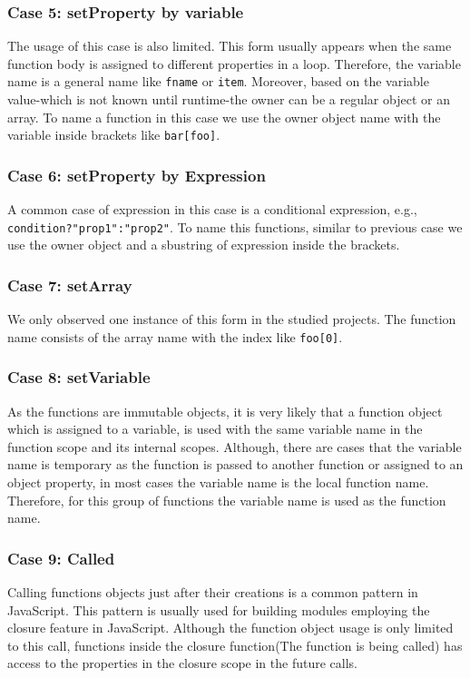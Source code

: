 \documentclass[10pt, preprint]{sigplanconf}
\begin{document}
{\subsubsection{Case 5: setProperty by variable}
The usage of this case is also limited. This form usually appears when the same function body is assigned to different properties in a loop. Therefore, the variable
 name is a general name like {\small\texttt{fname}} or {\small\texttt{item}}. Moreover, based on the variable value-which is not known until runtime-the owner can be a    regular object or an array. To name a function in this case we use the owner object name with the variable inside brackets like {\small\texttt{bar[foo]}}.

\subsubsection{Case 6: setProperty by Expression}
 A common case of expression in this case is a conditional expression, e.g., {\small\texttt{condition?"prop1":"prop2"}}. To name this functions, similar to previous case we use the owner object and a sbustring of expression inside the brackets.
 

\subsubsection{Case 7: setArray}
We only observed one instance of this form in the studied projects. The function name consists of the array name with the index like {\small\texttt{foo[0]}}.

\subsubsection{Case 8: setVariable }
As the functions are immutable objects, it is very likely that a function object which is assigned to a variable, is used with the same variable name in the function scope
and its internal scopes. Although, there are cases that the variable name is temporary as the function is passed to another function or assigned to an object property, in most cases the variable name is the local function name. Therefore, for this group of functions the variable name is used as the function name.

\subsubsection{Case 9: Called}
Calling functions objects just after their creations is a common pattern in JavaScript. This pattern is usually used for building modules employing the closure feature in JavaScript. Although the function object usage is only limited to this call, functions inside the closure function(The function is being called) has access to the properties in the closure scope in the future calls. 

}
\end{document}
